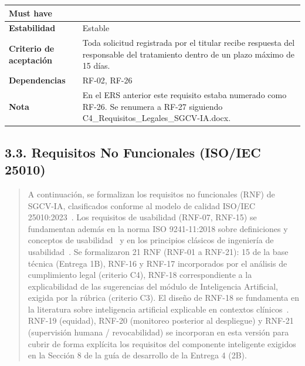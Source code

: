 \documentclass[
]{article}
\begin{document}
{\begin{longtable}[]{|
  >{\raggedright\arraybackslash}p{}|
  >{\raggedright\arraybackslash}p{}|}
\begin{minipage}[t]{\linewidth}
Must have
\end{minipage} \\
\hline
\textbf{Estabilidad} & \begin{minipage}[t]{\linewidth}\raggedright
Estable
\end{minipage} \\
\hline
\textbf{Criterio de aceptación} &
\begin{minipage}[t]{\linewidth}\raggedright
Toda solicitud registrada por el titular recibe respuesta del responsable del tratamiento dentro de un plazo máximo de 15 días.
\end{minipage} \\
\hline
\textbf{Dependencias} & \begin{minipage}[t]{\linewidth}\raggedright
RF-02, RF-26
\end{minipage} \\
\hline
\textbf{Nota} & \begin{minipage}[t]{\linewidth}\raggedright
En el ERS anterior este requisito estaba numerado como RF-26. Se renumera a RF-27 siguiendo C4\_Requisitos\_Legales\_SGCV-IA.docx.
\end{minipage} \\
\hline
\end{longtable}
}


\subsection{3.3. Requisitos No Funcionales (ISO/IEC 25010)}\label{requisitos-no-funcionales-isoiec-25010}

\begin{quote}
A continuación, se formalizan los requisitos no funcionales (RNF) de
SGCV-IA, clasificados conforme al modelo de calidad ISO/IEC
25010:2023~\cite{iso25010}. Los requisitos de usabilidad (RNF-07,
RNF-15) se fundamentan además en la norma ISO 9241-11:2018 sobre
definiciones y conceptos de usabilidad~\cite{iso9241} y en los
principios clásicos de ingeniería de usabilidad~\cite{nielsen1993}. Se
formalizaron 21 RNF (RNF-01 a RNF-21):
15 de la base técnica (Entrega 1B), RNF-16 y RNF-17 incorporados por el
análisis de cumplimiento legal (criterio C4), RNF-18 correspondiente
a la explicabilidad de las sugerencias del módulo de Inteligencia
Artificial, exigida por la rúbrica (criterio C3). El diseño de RNF-18
se fundamenta en la literatura sobre inteligencia artificial
explicable en contextos clínicos~\cite{mienye2024,jung2023,rosenbacke2024,vanvoorst2024,tun2025,ahmed2023,he2023,bulletti2024}.
RNF-19 (equidad), RNF-20 (monitoreo posterior al despliegue) y RNF-21
(supervisión humana / revocabilidad) se incorporan en esta versión para
cubrir de forma explícita los requisitos del componente inteligente
exigidos en la Sección 8 de la guía de desarrollo de la Entrega 4 (2B).
\end{quote}
\end{document}
